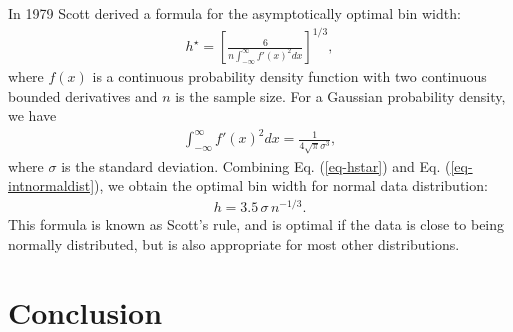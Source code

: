 \documentclass[
reprint,
superscriptaddress,
showpacs,
amsmath,
amssymb,
aps,
pra,
longbibliography
]{revtex4-1}
\begin{document}
In 1979 Scott derived a formula for the asymptotically optimal bin width:
\begin{eqnarray}
h^{\star} = \left[ \frac{6}{n \int_{-\infty}^{\infty} f'(x)^2 dx} \right]^{1/3},
\label{eq-hstar}
\end{eqnarray}
where $f(x)$ is a continuous probability density function with two continuous bounded derivatives and $n$ is the sample size. For a Gaussian probability density, we have
\begin{eqnarray}
\int_{-\infty}^{\infty} f'(x)^2 dx = \frac{1}{4 \sqrt{\pi} \sigma ^3},
\label{eq-intnormaldist}
\end{eqnarray}
where $\sigma$ is the standard deviation. Combining Eq. (\ref{eq-hstar}) and Eq. (\ref{eq-intnormaldist}), we obtain the optimal bin width for normal data distribution:
\begin{eqnarray}
h = 3.5 \, \sigma \, n^{-1/3}.
\end{eqnarray}
This formula is known as Scott's rule, and is optimal if the data is close to being normally distributed, but is also appropriate for most other distributions.

\section{Conclusion}
\label{conclusion}



\begin{acknowledgments}
\end{acknowledgments}




%


\end{document}
